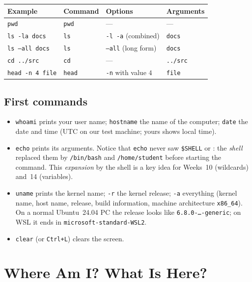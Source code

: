 \documentclass[11pt,a4paper]{article}
\newcommand{\cmd}[1]{\texttt{#1}}
\begin{document}
\begin{center}
\begin{tabular}{l l l l}
\toprule
\textbf{Example} & \textbf{Command} & \textbf{Options} & \textbf{Arguments}\\
\midrule
\texttt{pwd} & \texttt{pwd} & --- & ---\\
\texttt{ls -la docs} & \texttt{ls} & \texttt{-l -a} (combined) & \texttt{docs}\\
\texttt{ls --all docs} & \texttt{ls} & \texttt{--all} (long form) & \texttt{docs}\\
\texttt{cd ../src} & \texttt{cd} & --- & \texttt{../src}\\
\texttt{head -n 4 file} & \texttt{head} & \texttt{-n} with value $4$ & \texttt{file}\\
\bottomrule
\end{tabular}
\end{center}

\subsection{First commands}
\label{sec:first}


\begin{itemize}
  \item \cmd{whoami} prints your user name; \cmd{hostname} the name of the computer; \cmd{date} the date and time (UTC on our test machine; yours shows local time).
  \item \cmd{echo} prints its arguments. Notice that \cmd{echo} never saw \texttt{\$SHELL} or \texttt{\tl}: the \emph{shell} replaced them by \texttt{/bin/bash} and \texttt{/home/student} before starting the command. This \emph{expansion} by the shell is a key idea for Weeks~10 (wildcards) and~14 (variables).
  \item \cmd{uname} prints the kernel name; \cmd{-r} the kernel release; \cmd{-a} everything (kernel name, host name, release, build information, machine architecture \texttt{x86\_64}). On a normal Ubuntu~24.04 PC the release looks like \texttt{6.8.0-\ldots-generic}; on WSL it ends in \texttt{microsoft-standard-WSL2}.
  \item \cmd{clear} (or \texttt{Ctrl+L}) clears the screen.
\end{itemize}

\section{Where Am I? What Is Here?}
\label{sec:ls}
\end{document}

